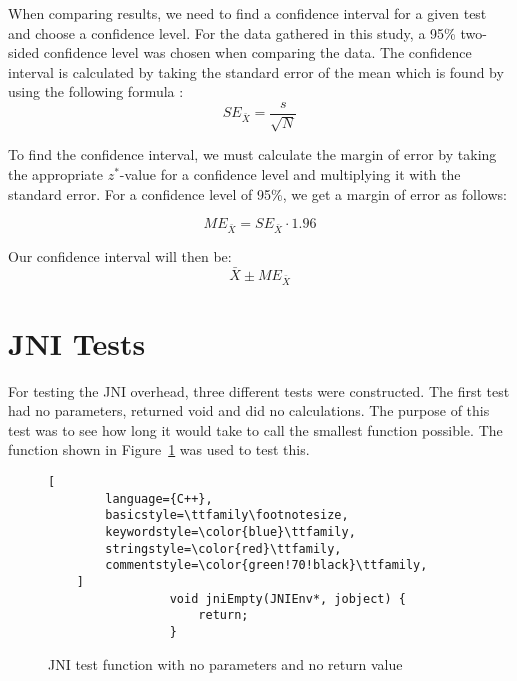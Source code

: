 When comparing results, we need to find a confidence interval for a given test and choose a confidence level. For the data gathered in this study, a 95\% two-sided confidence level was chosen when comparing the data. The confidence interval is calculated by taking the standard error of the mean which is found by using the following formula \cite[p.~304]{olofsson2012probability}:
\begin{equation*}
    SE_{\bar{X}} = \frac{s}{\sqrt{N}}
\end{equation*}

To find the confidence interval, we must calculate the margin of error by taking the appropriate $z^*$-value for a confidence level and multiplying it with the standard error. For a confidence level of 95\%, we get a margin of error as follows:

\begin{equation*}
    ME_{\bar{X}} = SE_{\bar{X}} \cdot 1.96
\end{equation*}

Our confidence interval will then be:
\begin{equation*}
    \bar{X} \pm ME_{\bar{X}}
\end{equation*}


\section{JNI Tests}
For testing the JNI overhead, three different tests were constructed. The first test had no parameters, returned void and did no calculations. The purpose of this test was to see how long it would take to call the smallest function possible. The function shown in Figure~\ref{fig:jni:empty} was used to test this.

\begin{figure}[H]
\begin{lstlisting}[
        language={C++},
        basicstyle=\ttfamily\footnotesize,
        keywordstyle=\color{blue}\ttfamily,
        stringstyle=\color{red}\ttfamily,
        commentstyle=\color{green!70!black}\ttfamily,
    ]
                 void jniEmpty(JNIEnv*, jobject) {
                     return;
                 }
\end{lstlisting}
\caption{JNI test function with no parameters and no return value}
\label{fig:jni:empty}
\end{figure}

